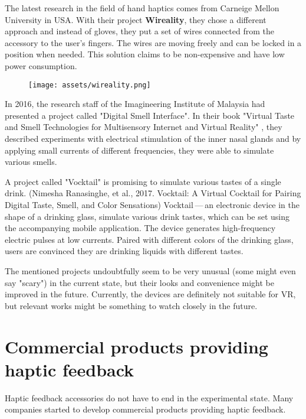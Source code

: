 The latest research in the field of hand haptics comes from Carneige Mellon
University in USA. With their project \textbf{Wireality}, they chose a different
approach and instead of gloves, they put a set of wires connected from the
accessory to the user’s fingers. The wires are moving freely and can be locked
in a position when needed. This solution claims to be non-expensive and
have low power consumption. \cite{wireality}


\begin{figure}[h]{}
\centering\texttt{[image: assets/wireality.png]}
\caption{}

\end{figure}

In 2016, the research staff of the Imagineering Institute of Malaysia
had presented a project called "Digital Smell Interface". In their book
"Virtual Taste and Smell Technologies for Multisensory Internet and Virtual
Reality" \cite{vrstmivr}, they described experiments with electrical stimulation
of the inner nasal glands and by applying small currents of different
frequencies, they were able to simulate various smells.


A project called "Vocktail" is promising to simulate various tastes of a single
drink.
(Nimesha Ranasinghe, et al., 2017. Vocktail: A Virtual Cocktail for Pairing
Digital Taste, Smell, and Color Sensations) \cite{vocktail} Vocktail — an electronic
device in the shape of a drinking glass, simulate various drink tastes,
which can be set using the accompanying mobile application. The device
generates high-frequency electric pulses at low currents. Paired with
different colors of the drinking glass, users are convinced they are drinking
liquids with different tastes.


The mentioned projects undoubtfully seem to be very unusual
(some might even say "scary") in the current state, but their looks and convenience
might be improved in the future. Currently, the devices are definitely not
suitable for VR, but relevant works might be something to
watch closely in the future.


\hypertarget{x-commercial-products-providing-haptic-feedback}{\section{Commercial products providing haptic feedback}}
Haptic feedback accessories do not have to end in the experimental state.
Many companies started to develop commercial products providing haptic feedback.


